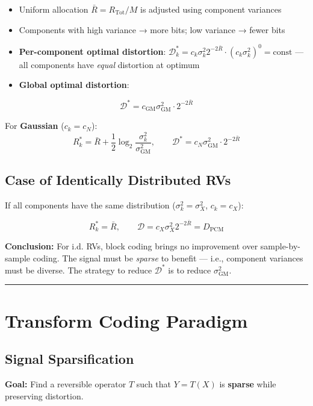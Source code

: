 \begin{itemize}
\item Uniform allocation $\bar{R} = R_{\text{Tot}}/M$ is adjusted using component variances
\item Components with high variance → more bits; low variance → fewer bits
\item \textbf{Per-component optimal distortion}: $\mathcal{D}_k^* = c_k \sigma_k^2 2^{-2\bar{R}} \cdot (c_k\sigma_k^2)^0 = \text{const}$ — all components have \textit{equal} distortion at optimum
\item \textbf{Global optimal distortion}:
\end{itemize}
\[
\mathcal{D}^* = c_{\text{GM}}\sigma_{\text{GM}}^2 \cdot 2^{-2\bar{R}}
\]

For \textbf{Gaussian} ($c_k = c_N$):
\[
R_k^* = \bar{R} + \frac{1}{2}\log_2\frac{\sigma_k^2}{\sigma_{\text{GM}}^2}, \qquad \mathcal{D}^* = c_N \sigma_{\text{GM}}^2 \cdot 2^{-2\bar{R}}
\]

\subsection{Case of Identically Distributed RVs}

If all components have the same distribution ($\sigma_k^2 = \sigma_X^2$, $c_k = c_X$):

\[
R_k^* = \bar{R}, \qquad \mathcal{D} = c_X \sigma_X^2 2^{-2\bar{R}} = D_{\text{PCM}}
\]

\textbf{Conclusion:} For i.d. RVs, block coding brings no improvement over sample-by-sample coding. The signal must be \textit{sparse} to benefit — i.e., component variances must be diverse. The strategy to reduce $\mathcal{D}^*$ is to reduce $\sigma_{\text{GM}}^2$.

\bigskip\hrule\bigskip

\section{Transform Coding Paradigm}

\subsection{Signal Sparsification}

\textbf{Goal:} Find a reversible operator $T$ such that $Y = T(X)$ is \textbf{sparse} while preserving distortion.


